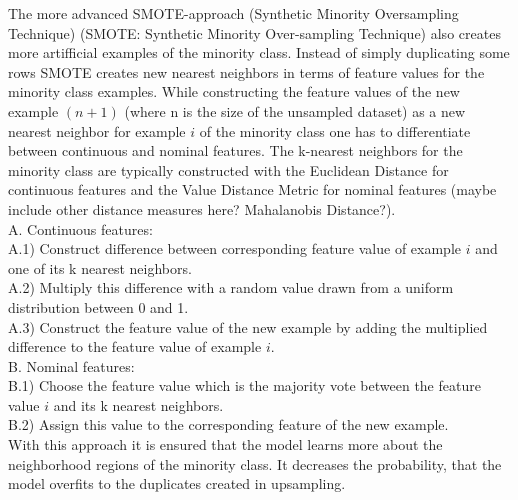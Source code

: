 \documentclass[12pt,titlepage]{article}
\begin{document}
The more advanced SMOTE-approach (Synthetic Minority Oversampling Technique) (SMOTE: Synthetic Minority Over-sampling Technique) also creates more artifficial examples of
the minority class. Instead of simply duplicating some rows SMOTE creates new nearest neighbors in terms of feature values for the minority class examples. 
While constructing the feature values of the new example $(n + 1)$ (where n is the size of the unsampled dataset) as a new nearest neighbor for example $i$ of the
minority class one has to differentiate between continuous and nominal features. The k-nearest neighbors for the minority class are typically constructed with the Euclidean
Distance for continuous features and the Value Distance Metric for nominal features (maybe include other distance measures here? Mahalanobis Distance?).\\
A. Continuous features: \\
A.1) Construct difference between corresponding feature value of example $i$ and one of its k nearest neighbors. \\
A.2) Multiply this difference with a random value drawn from a uniform distribution between 0 and 1. \\
A.3) Construct the feature value of the new example by adding the multiplied difference to the feature value of example $i$. \\
B. Nominal features: \\
B.1) Choose the feature value which is the majority vote between the feature value $i$ and its k nearest neighbors. \\
B.2) Assign this value to the corresponding feature of the new example. \\
With this approach it is ensured that the model learns more about the neighborhood regions of the minority class. It decreases the probability, that the model overfits to the
duplicates created in upsampling. \\
\end{document}
